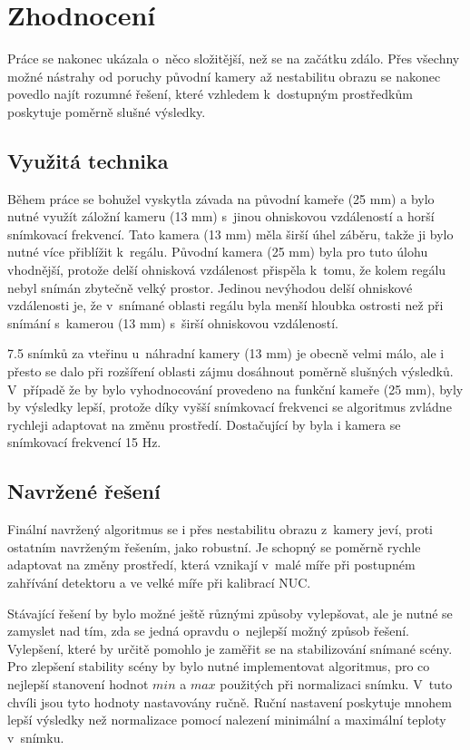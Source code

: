 \chapter{Zhodnocení}
Práce se nakonec ukázala o~něco složitější, než se na začátku zdálo. Přes všechny možné nástrahy od poruchy původní kamery až nestabilitu obrazu se nakonec povedlo najít rozumné řešení, které vzhledem k~dostupným prostředkům poskytuje poměrně slušné výsledky. 

\section{Využitá technika}
Během práce se bohužel vyskytla závada na původní kameře (25 mm) a bylo nutné využít záložní kameru (13 mm) s~jinou ohniskovou vzdáleností a horší snímkovací frekvencí. Tato kamera (13 mm) měla širší úhel záběru, takže ji bylo nutné více přiblížit k~regálu. Původní kamera (25 mm) byla pro tuto úlohu vhodnější, protože delší ohnisková vzdálenost přispěla k~tomu, že kolem regálu nebyl snímán zbytečně velký prostor. Jedinou nevýhodou delší ohniskové vzdálenosti je, že v~snímané oblasti regálu byla menší hloubka ostrosti než při snímání s~kamerou (13 mm) s~širší ohniskovou vzdáleností. 

7.5 snímků za vteřinu u~náhradní kamery (13 mm) je obecně velmi málo, ale i přesto se dalo při rozšíření oblasti zájmu dosáhnout poměrně slušných výsledků. V~případě že by bylo vyhodnocování provedeno na funkční kameře (25 mm), byly by výsledky lepší, protože díky vyšší snímkovací frekvenci se algoritmus zvládne rychleji adaptovat na změnu prostředí. Dostačující by byla i kamera se snímkovací frekvencí 15 Hz.

\section{Navržené řešení}
Finální navržený algoritmus se i přes nestabilitu obrazu z~kamery jeví, proti ostatním navrženým řešením, jako robustní. Je schopný se poměrně rychle adaptovat na změny prostředí, která vznikají v~malé míře při postupném zahřívání detektoru a ve velké míře při kalibrací NUC.

Stávající řešení by bylo možné ještě různými způsoby vylepšovat, ale je nutné se zamyslet nad tím, zda se jedná opravdu o~nejlepší možný způsob řešení. Vylepšení, které by určitě pomohlo je zaměřit se na stabilizování snímané scény. Pro zlepšení stability scény by bylo nutné implementovat algoritmus, pro co nejlepší stanovení hodnot $min$ a $max$ použitých při normalizaci snímku. V~tuto chvíli jsou tyto hodnoty nastavovány ručně. Ruční nastavení poskytuje mnohem lepší výsledky než normalizace pomocí nalezení minimální a maximální teploty v~snímku. 

